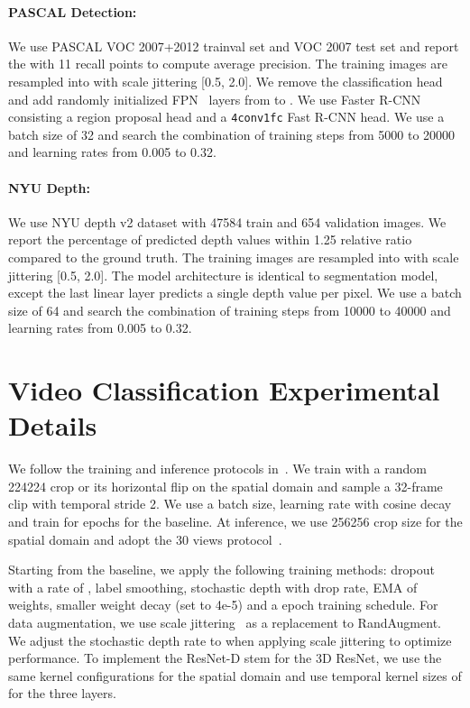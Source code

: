 \documentclass{article}
\begin{document}
\paragraph{PASCAL Detection:}
We use PASCAL VOC 2007+2012 trainval set and VOC 2007 test set and report the  with 11 recall points to compute average precision. The training images are resampled into  with scale jittering [0.5, 2.0]. We remove the classification head and add randomly initialized FPN~\cite{fpn} layers from  to . We use Faster R-CNN~\cite{ren2015faster} consisting a region proposal head and a \texttt{4conv1fc} Fast R-CNN head. We use a batch size of 32 and search the combination of training steps from 5000 to  20000 and learning rates from 0.005 to 0.32.

\paragraph{NYU Depth:} We use NYU depth v2 dataset with 47584 train and 654 validation images. We report the percentage of predicted depth values within 1.25 relative ratio compared to the ground truth. The training images are resampled into  with scale jittering [0.5, 2.0]. The model architecture is identical to segmentation model, except the last linear layer predicts a single depth value per pixel. We use a batch size of 64 and search the combination of training steps from 10000 to 40000 and learning rates from 0.005 to 0.32.

\section{Video Classification Experimental Details\label{sec:video_classification_details}}
We follow the training and inference protocols in~\cite{Qian2020SpatiotemporalCV, Feichtenhofer2019SlowFastNF}.
We train with a random 224224 crop or its horizontal flip on the spatial domain and sample a 32-frame clip with temporal stride 2. 
We use a  batch size,  learning rate with cosine decay and train for  epochs for the baseline.
At inference, we use 256256 crop size for the spatial domain and adopt the 30 views protocol~\cite{Feichtenhofer2019SlowFastNF}. 

Starting from the baseline, we apply the following training methods: dropout with a rate of ,  label smoothing, stochastic depth with  drop rate, EMA of weights, smaller weight decay (set to 4e-5) and a  epoch training schedule.
For data augmentation, we use scale jittering~\cite{Qian2020SpatiotemporalCV} as a replacement to RandAugment. 
We adjust the stochastic depth rate to  when applying scale jittering to optimize performance.
To implement the ResNet-D stem for the 3D ResNet, we use the same kernel configurations for the spatial domain and use temporal kernel sizes of  for the three layers.
\end{document}
